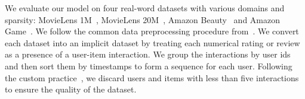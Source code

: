We evaluate our model on four real-word datasets with various domains and sparsity: MovieLens 1M~\cite{movielens}, MovieLens 20M~\cite{movielens}, Amazon Beauty~\cite{amazondataset} and Amazon Game~\cite{amazondataset}. We follow the common data preprocessing procedure from~\cite{TRANSREC, SASRec, TISASRec, BERT4Rec}. We convert each dataset into an implicit dataset by treating each numerical rating or review as a presence of a user-item interaction. We group the interactions by user ids and then sort them by timestamps to form a sequence for each user. Following the custom practice~\cite{TRANSREC, SASRec, TISASRec, BERT4Rec},  we discard users and items with less than five interactions to ensure the quality of the dataset.








